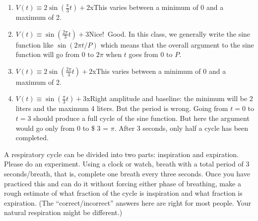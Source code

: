 \documentclass[
  letterpaper,
  DIV=11,
  numbers=noendperiod,
  oneside]{article}
\providecommand{\tightlist}{%
  \setlength{\itemsep}{0pt}\setlength{\parskip}{0pt}}\usepackage{longtable,booktabs,array}
\begin{document}
\begin{multicols}{2}
\begin{table}
\begin{minipage}[t]{\linewidth}
{\begin{enumerate}
\def\labelenumi{\roman{enumi}.}
\tightlist
\item
  {\(V(t) \equiv 2 \sin \left( \frac{\pi}{3} t \right) + 2\){xThis
  varies between a minimum of 0 and a maximum of 2.}}\\
\item
  {\(V(t) \equiv \sin \left( \frac{2\pi}{3} t \right) + 3\){Nice!~Good.
  In this class, we generally write the sine function like
  \(\sin(2 \pi t/P)\) which means that the overall argument to the sine
  function will go from 0 to \(2 \pi\) when \(t\) goes from 0 to
  \(P\).}}\\
\item
  {\(V(t) \equiv 2 \sin \left( \frac{2\pi}{3} t \right)+ 2\){xThis
  varies between a minimum of 0 and a maximum of 2.}}\\
\item
  {\(V(t) \equiv \sin \left( \frac{\pi}{3} t \right) + 3\){xRight
  amplitude and baseline: the minimum will be 2 liters and the maximum 4
  liters. But the period is wrong. Going from \(t=0\) to \(t=3\) should
  produce a full cycle of the sine function. But here the argument would
  go only from 0 to \$ 3 = \(\pi\). After 3 seconds, only
  half a cycle has been completed.}}
\end{enumerate}

}

\end{minipage}%
\newline
\begin{minipage}[t]{\linewidth}

{\centering 

A respiratory cycle can be divided into two parts: inspiration and
expiration. Please do an experiment. Using a clock or watch, breath with
a total period of 3 seconds/breath, that is, complete one breath every
three seconds. Once you have practiced this and can do it without
forcing either phase of breathing, make a rough estimate of what
fraction of the cycle is inspiration and what fraction is expiration.
(The ``correct/incorrect'' answers here are right for most people. Your
natural respiration might be different.)

}

\end{minipage}%
\newline
\begin{minipage}[t]{\linewidth}

{\centering 

}
\end{minipage}
\end{table}
\end{multicols}
\end{document}
